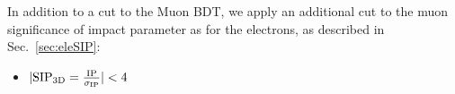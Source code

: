 In addition to a cut to the Muon BDT, we apply an additional cut to the muon significance of impact parameter as for the electrons, as described in Sec.~\ref{sec:eleSIP}:                                                                                                                                                               
%                                                                                                                                                                                                                                          
\begin{itemize}                                                                                                                                                                                                                            
\item $| {\rm SIP_{3D}} =    \frac{\rm IP}{\sigma_{\rm IP}} | < 4$                                                                                                                                                                         
\end{itemize}  

